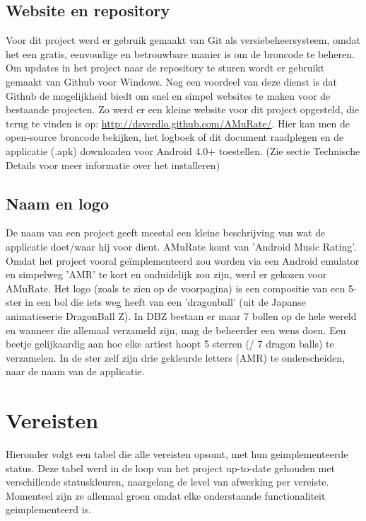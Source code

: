 \documentclass[11pt,a4paper]{article}
\begin{document}
	\subsection{Website en repository}
		Voor dit project werd er gebruik gemaakt van Git als versiebeheersysteem, omdat het een gratis, eenvoudige en betrouwbare manier is om de broncode te beheren. Om updates in het project naar de repository te sturen wordt er gebruikt gemaakt van Github voor Windows. Nog een voordeel van deze dienst is dat Github de mogelijkheid biedt om snel en simpel websites te maken voor de bestaande projecten. Zo werd er een kleine website voor dit project opgesteld, die terug te vinden is op: \url{http://dsverdlo.github.com/AMuRate/}. Hier kan men de open-source broncode bekijken, het logboek of dit document raadplegen en de applicatie (.apk) downloaden voor Android 4.0+ toestellen. (Zie sectie Technische Details voor meer informatie over het installeren)
		
	\subsection{Naam en logo}
		De naam van een project geeft meestal een kleine beschrijving van wat de applicatie doet/waar hij voor dient. AMuRate komt van 'Android Music Rating'. Omdat het project vooral geïmplementeerd zou worden via een Android emulator en simpelweg 'AMR' te kort en onduidelijk zou zijn, werd er gekozen voor AMuRate. Het logo (zoals te zien op de voorpagina) is een compositie van een 5-ster in een bol die iets weg heeft van een 'dragonball' (uit de Japanse animatieserie DragonBall Z). In DBZ bestaan er maar 7 bollen op de hele wereld en wanneer die allemaal verzameld zijn, mag de beheerder een wens doen. Een beetje gelijkaardig aan hoe elke artiest hoopt 5 sterren (/ 7 dragon balls) te verzamelen. 
	In de ster zelf zijn drie gekleurde letters (AMR) te onderscheiden, naar de naam van de applicatie.
	
	
\section{Vereisten}
Hieronder volgt een tabel die alle vereisten opsomt, met hun geimplementeerde status. Deze tabel werd in de loop van het project up-to-date gehouden met verschillende statuskleuren, naargelang de level van afwerking per vereiste. Momenteel zijn ze allemaal groen omdat elke onderstaande functionaliteit geimplementeerd is.
\end{document}
